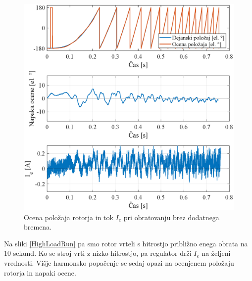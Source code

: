 \documentclass[a4paper,twoside,openright,12pt,slovene]{book}
\begin{document}
\begin{figure}[!htbp]
    \centering
    \includegraphics[width=0.99\columnwidth]{Slike/NoLoadRun.eps}
    \caption{\label{NoLoadRun} Ocena položaja rotorja in tok $I_e$ pri obratovanju brez dodatnega bremena. }
\end{figure}

\newpage

Na sliki \ref{HighLoadRun} pa smo rotor vrteli s hitrostjo približno enega obrata na 10 sekund. Ko se stroj vrti z nizko hitrostjo, pa regulator drži $I_e$ na željeni vrednosti. Višje harmonsko
popačenje se sedaj opazi na ocenjenem položaju rotorja in napaki ocene. 
\end{document}
